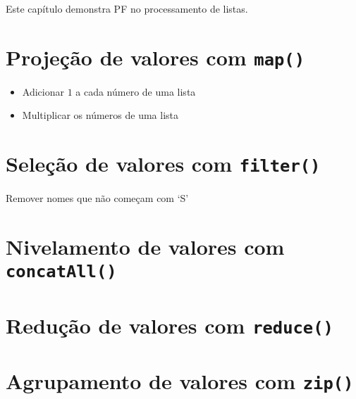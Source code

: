 Este capítulo demonstra PF no processamento de listas.

\section{Projeção de valores com \texttt{map()}}
\label{sec:orgec60fd2}
\begin{itemize}
\item Adicionar \(1\) a cada número de uma lista
\item Multiplicar os números de uma lista
\end{itemize}

\section{Seleção de valores com \texttt{filter()}}
\label{sec:org5394896}
Remover nomes que não começam com ‘S’

\section{Nivelamento de valores com \texttt{concatAll()}}
\label{sec:orgb403d96}
\section{Redução de valores com \texttt{reduce()}}
\label{sec:orgba0db57}
\section{Agrupamento de valores com \texttt{zip()}}
\label{sec:org37e4313}
